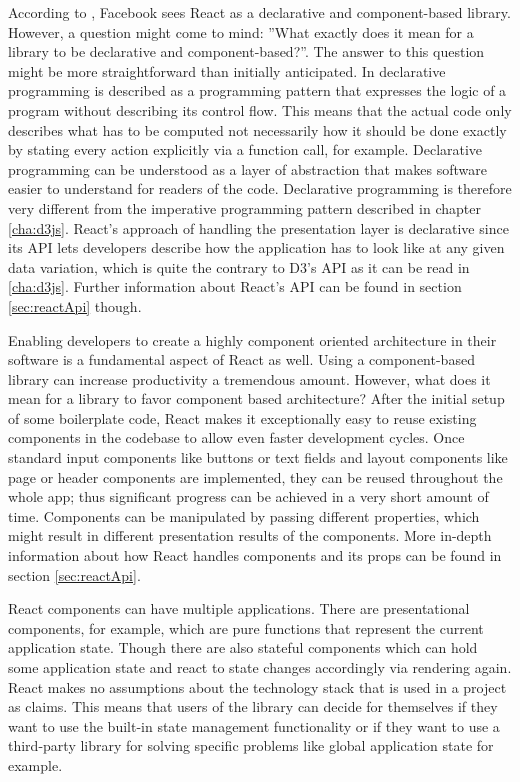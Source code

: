According to \cite{React}, Facebook sees React as a declarative and component-based library. However, a question might come to mind: ''What exactly does it mean for a library to be declarative and component-based?''. The answer to this question might be more straightforward than initially anticipated. In \cite{lloyd1994practical} declarative programming is described as a programming pattern that expresses the logic of a program without describing its control flow. This means that the actual code only describes what has to be computed not necessarily how it should be done exactly by stating every action explicitly via a function call, for example. Declarative programming can be understood as a layer of abstraction that makes software easier to understand for readers of the code. Declarative programming is therefore very different from the imperative programming pattern described in chapter \ref{cha:d3js}. React's approach of handling the presentation layer is declarative since its API lets developers describe how the application has to look like at any given data variation, which is quite the contrary to D3's API as it can be read in \ref{cha:d3js}. Further information about React's API can be found in section \ref{sec:reactApi} though.

Enabling developers to create a highly component oriented architecture in their software is a fundamental aspect of React as well. Using a component-based library can increase productivity a tremendous amount. However, what does it mean for a library to favor component based architecture? After the initial setup of some boilerplate code, React makes it exceptionally easy to reuse existing components in the codebase to allow even faster development cycles. Once standard input components like buttons or text fields and layout components like page or header components are implemented, they can be reused throughout the whole app; thus significant progress can be achieved in a very short amount of time. Components can be manipulated by passing different properties, which might result in different presentation results of the components. More in-depth information about how React handles components and its props can be found in section \ref{sec:reactApi}.

React components can have multiple applications. There are presentational components, for example, which are pure functions that represent the current application state. Though there are also stateful components which can hold some application state and react to state changes accordingly via rendering again. React makes no assumptions about the technology stack that is used in a project as \cite{React} claims. This means that users of the library can decide for themselves if they want to use the built-in state management functionality or if they want to use a third-party library for solving specific problems like global application state for example.

